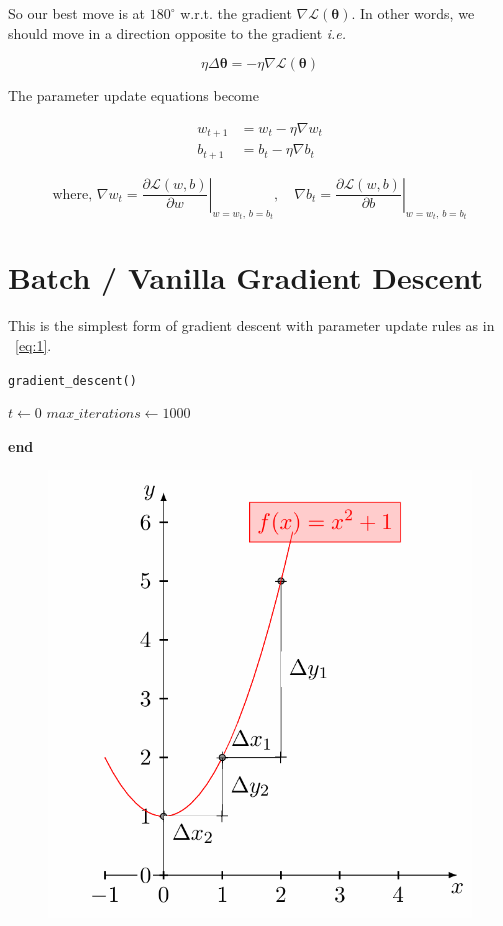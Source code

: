 \documentclass[11pt, a4paper]{article}
\begin{document}
So our best move is at $180^{\circ}$ w.r.t. the gradient $\nabla \mathscr{L}(\boldsymbol{\theta})$.  In other words, we should move in a direction opposite to the gradient \textit{i.e.}

$$ \eta \Delta\boldsymbol{\theta} = - \eta \nabla \mathscr{L}(\boldsymbol{\theta})$$

The parameter update equations become

\begin{align} \label{eq:1}
w_{t+1} &= w_t - \eta \nabla w_t \nonumber \\
b_{t+1} &= b_t - \eta \nabla b_t
\end{align}

$$ \text{where, } \nabla w_t = \left. \dfrac{\partial \mathscr{L}(w, b)}{\partial w} \right|_{w = w_t,\, b = b_t}, \quad
\nabla b_t = \left. \dfrac{\partial \mathscr{L}(w, b)}{\partial b} \right|_{w = w_t,\, b = b_t} $$

\section{Batch / Vanilla Gradient Descent}

This is the simplest form of gradient descent with parameter update rules as in ~\ref{eq:1}. \\[0.15em]

\begin{algorithm}[H]
\caption{\texttt{gradient\_descent()}}
$t \leftarrow 0$\;
$max\_iterations \leftarrow 1000$\;

\textbf{end}
\end{algorithm}



\begin{figure}[!htbp]
\centering
\includegraphics[scale=0.5]{image_3}
\end{figure}
\end{document}
